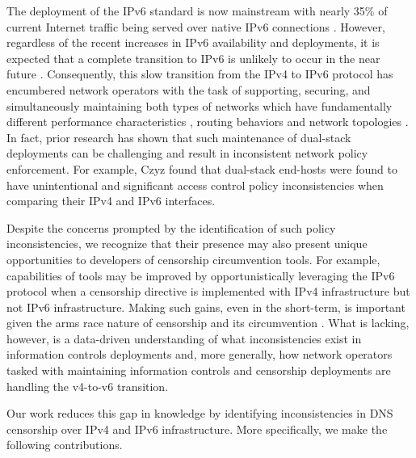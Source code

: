 The deployment of the IPv6 standard is now mainstream with nearly 35\% of
current Internet traffic being served over native IPv6 connections
\cite{Google-IPv6}. However, regardless of the recent increases in IPv6
availability and deployments, it is expected that a complete transition to IPv6
is unlikely to occur in the near future \cite{Prince-CF2013, Huston-APNIC2021}.
%
Consequently, this slow transition from the IPv4 to IPv6 protocol has
encumbered network operators with the task of supporting, securing, and
simultaneously maintaining both types of networks which have fundamentally
different performance characteristics \cite{Dhamdhere-IMC2012}, routing
behaviors and network topologies \cite{Czyz-SIGCOMM2014}.
%
In fact, prior research has shown that such maintenance of dual-stack
deployments can be challenging and result in inconsistent network policy
enforcement.
%
For example, Czyz \etal \cite{Czyz-NDSS2016} found that dual-stack end-hosts
were found to have unintentional and significant access control policy
inconsistencies when comparing their IPv4 and IPv6 interfaces. 

Despite the concerns prompted by the identification of such policy
inconsistencies, we recognize that their presence may also present unique
opportunities to developers of censorship circumvention tools. For example,
capabilities of tools may be improved by opportunistically leveraging the IPv6
protocol when a censorship directive is implemented with IPv4 infrastructure
but not IPv6 infrastructure.
%
Making such gains, even in the short-term, is important given the arms race
nature of censorship and its circumvention \cite{Tschantz-SP2016}.
%
What is lacking, however, is a data-driven understanding of what
inconsistencies exist in information controls deployments and, more generally,
how network operators tasked with maintaining information controls and
censorship deployments are handling the v4-to-v6 transition. 

Our work reduces this gap in knowledge by identifying inconsistencies in DNS
censorship over IPv4 and IPv6 infrastructure. More specifically, we make the
following contributions.

